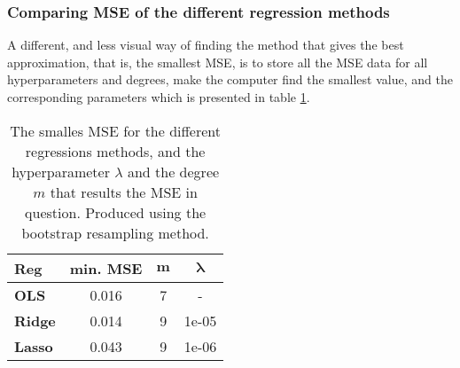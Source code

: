 \subsubsection{Comparing MSE of the different regression methods}
A different, and less visual way of finding the method that gives the best approximation, that is, the smallest MSE, is to store all the MSE data for all hyperparameters and degrees, make the computer find the smallest value, and the corresponding parameters which is presented in table \ref{tab:minerrorFRANKE}.
\begin{table}[htbp]
\caption{The smalles MSE for the different regressions methods, and the hyperparameter $\lambda$ and the degree $m$ that results the MSE in question. Produced using the bootstrap resampling method.}
\centering
\begin{tabular}[width=0.5\textwidth]{lccc}
\hline
\textbf{Reg} & \textbf{min. MSE} & $\boldsymbol{m}$ & $\boldsymbol{\lambda}$ \\
\hline
\textbf{OLS} & 0.016 & 7 & - \\
\textbf{Ridge} & 0.014 & 9 & 1e-05 \\
\textbf{Lasso} & 0.043 & 9 & 1e-06
\end{tabular}
\label{tab:minerrorFRANKE}
\end{table}


\vfill
\newpage
